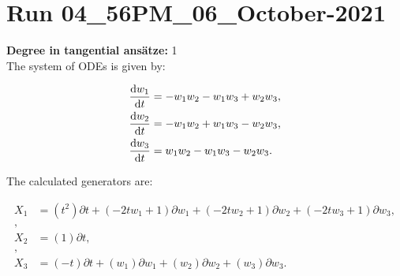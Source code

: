 \section*{Run 04\_56PM\_06\_October-2021}
\textbf{Degree in tangential ansätze:}	1\\
The system of ODEs is given by:

\begin{align*}
\dv{w_{1}}{t}&=- w_{1} w_{2} - w_{1} w_{3} + w_{2} w_{3},\\
\dv{w_{2}}{t}&=- w_{1} w_{2} + w_{1} w_{3} - w_{2} w_{3},\\
\dv{w_{3}}{t}&=w_{1} w_{2} - w_{1} w_{3} - w_{2} w_{3}.\\
\end{align*}

\noindent The calculated generators are:

\begin{align*}
X_{1}&=\left( t^{2} \right)\partial t+\left( - 2 t w_{1} + 1 \right)\partial w_{1}+\left( - 2 t w_{2} + 1 \right)\partial w_{2}+\left( - 2 t w_{3} + 1 \right)\partial w_{3},\\
,\\
X_{2}&=\left( 1 \right)\partial t,\\
,\\
X_{3}&=\left( - t \right)\partial t+\left( w_{1} \right)\partial w_{1}+\left( w_{2} \right)\partial w_{2}+\left( w_{3} \right)\partial w_{3}.\\
\end{align*}
